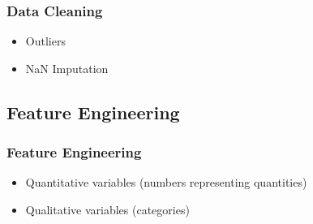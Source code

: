 \begin{frame}\frametitle{Data Cleaning}
   \begin{itemize}
      \item Outliers
      \item NaN Imputation
   \end{itemize}
\end{frame}


\subsection{Feature Engineering}

\begin{frame}\frametitle{Feature Engineering}
   \begin{itemize}
      \item Quantitative variables (numbers representing quantities)
      \item Qualitative variables (categories)
   \end{itemize}
\end{frame}





